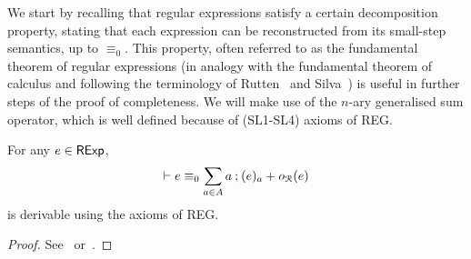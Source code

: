 We start by recalling that regular expressions satisfy a certain decomposition property, stating that each expression can be reconstructed from its small-step semantics, up to $\equiv_0$. This property, often referred to as the fundamental theorem of regular expressions (in analogy with the fundamental theorem of calculus and following the terminology of Rutten~\cite{Rutten:2000:Universal} and Silva~\cite{Silva:2010:Kleene}) is useful in further steps of the proof of completeness. We will make use of the $n$-ary generalised sum operator, which is well defined because of \textsf{(SL1-SL4)} axioms of \textsf{REG}.
\begin{theorem}\label{c2:thm:fundamental_theorem}
    For any $e \in \mathsf{RExp}$, $$
    \vdash e \equiv_0 \sum_{a \in {A}} a \mathbin{;} (e)_a + o_{\mathcal{R}}(e)
    $$ is derivable using the axioms of \textsf{REG}.
\end{theorem}
\begin{proof}
	See~\cite[Theorem~4.4]{Brzozowski:1964:Expressions} or~\cite[Lemma~4]{Salomaa:1966:Two}.
\end{proof}
%
